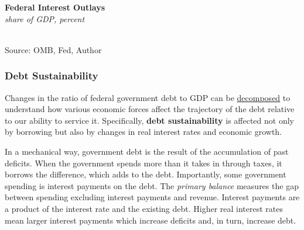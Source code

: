 \documentclass{report}
\makeatletter
\newcommand{\tbllink}[1]{\href{https://raw.githubusercontent.com/bdecon/US-chartbook/master/chartbook/data/#1}{\faTable}}
\newcommand*\short[1]{\expandafter\@gobbletwo\number\numexpr#1\relax}
\newcommand{\absnode}[3]{\node[below right, align=left] at (axis cs: #1,#2) {#3};}
\newcommand{\shdateaxisticks}{
		date coordinates in=x, axis line style={draw=none},
		xmax={2022-10-31},
		max space between ticks=40,	    
		xtick={{1990-01-01}, {1995-01-01}, {2000-01-01}, 
			{2005-01-01}, {2010-01-01}, {2015-01-01}, {2020-01-01}},
		minor xtick={},
		enlarge y limits={0.06}, enlarge x limits={0.01},
		}
\newcommand{\bbar}[2]{extra #1 ticks = {{#2}}, extra #1 tick labels = ,
		extra #1 tick style = {grid=major, grid style={thick, black!25}},}
\newcommand{\dashline}[4]{\addplot[very thick, dashed, no markers, color=#1] 
		table [x=#2, y=#3, col sep=comma] {#4};	}
\newcommand{\thickline}[4]{\addplot[ultra thick, no markers, color=#1] 
		table [x=#2, y=#3, col sep=comma] {#4};	}
\newcommand{\rbars}{
		\fill[color=black!10] (axis cs:{1990-07-01},\pgfkeysvalueof{/pgfplots/ymin}) rectangle 
			(axis cs:{1991-03-01}, \pgfkeysvalueof{/pgfplots/ymax});
		\fill[color=black!10] (axis cs:{2007-12-01},\pgfkeysvalueof{/pgfplots/ymin}) rectangle 
			(axis cs:{2009-07-01}, \pgfkeysvalueof{/pgfplots/ymax});
		\fill[color=black!10] (axis cs:{2001-03-01},\pgfkeysvalueof{/pgfplots/ymin}) rectangle 
			(axis cs:{2001-11-01}, \pgfkeysvalueof{/pgfplots/ymax});
		\fill[color=black!10] (axis cs:{2020-02-01},\pgfkeysvalueof{/pgfplots/ymin}) rectangle 
			(axis cs:{2020-05-01}, \pgfkeysvalueof{/pgfplots/ymax});}
\makeatother
\begin{document}
{\begin{minipage}{0.76\textwidth}
\begin{minipage}{0.46\textwidth}
\small 
\end{minipage} \hfill \begin{minipage}{0.48\textwidth}
\normalsize \textbf{Federal Interest Outlays}\\
\footnotesize{\textit{share of GDP, percent}}\\
\hspace*{-2mm} \\
\footnotesize{Source: OMB, Fed, Author} \hfill \tbllink{fedintexp.csv}
\end{minipage} 
\vspace{1mm}

\small 
\end{minipage}
\newpage
\begin{minipage}{0.76\textwidth}
\subsubsection*{Debt Sustainability}
\small Changes in the ratio of federal government debt to GDP can be \href{https://www.imf.org/en/Publications/TNM/Issues/2016/12/31/A-Practical-Guide-to-Public-Debt-Dynamics-Fiscal-Sustainability-and-Cyclical-Adjustment-of-23498}{decomposed} to understand how various economic forces affect the trajectory of the debt relative to our ability to service it. Specifically, \textbf{debt sustainability} is affected not only by borrowing but also by changes in real interest rates and economic growth. 

In a mechanical way, government debt is the result of the accumulation of past deficits. When the government spends more than it takes in through taxes, it borrows the difference, which adds to the debt. Importantly, some government spending is interest payments on the debt. The \textit{primary balance} measures the gap between spending excluding interest payments and revenue. Interest payments are a product of the interest rate and the existing debt. Higher real interest rates mean larger interest payments which increase deficits and, in turn, increase debt.


\end{minipage}}
\end{document}
